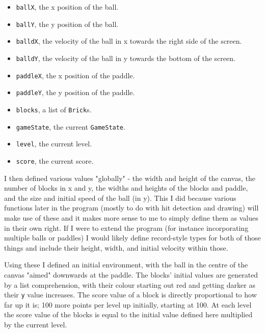 \documentclass[12pt]{article}
\begin{document}
\begin{itemize}
\begin{itemize}
      \item \verb|ballX|, the x position of the ball.
      \item \verb|ballY|, the y position of the ball.
      \item \verb|balldX|, the velocity of the ball in x towards the right side of the screen.
      \item \verb|balldY|, the velocity of the ball in y towards the bottom of the screen.
      \item \verb|paddleX|, the x position of the paddle.
      \item \verb|paddleY|, the y position of the paddle.
      \item \verb|blocks|, a list of \verb|Brick|s.
      \item \verb|gameState|, the current \verb|GameState|.
      \item \verb|level|, the current level.
      \item \verb|score|, the current score.
    \end{itemize}

\end{itemize}

I then defined various values "globally" - the width and height of the canvas, the number of blocks in x and y, the widths and heights of the blocks and paddle, and the size and initial speed of the ball (in y).
This I did because various functions later in the program (mostly to do with hit detection and drawing) will make use of these and it makes more sense to me to simply define them as values in their own right.
If I were to extend the program (for instance incorporating multiple balls or paddles) I would likely define record-style types for both of those things and include their height, width, and initial velocity within those.

\par

Using these I defined an initial environment, with the ball in the centre of the canvas "aimed" downwards at the paddle.
The blocks' initial values are generated by a list comprehension, with their colour starting out red and getting darker as their \verb|y| value increases.
The score value of a block is directly proportional to how far up it is; 100 more points per level up initially, starting at 100.
At each level the score value of the blocks is equal to the initial value defined here multiplied by the current level.

\par
\end{document}
